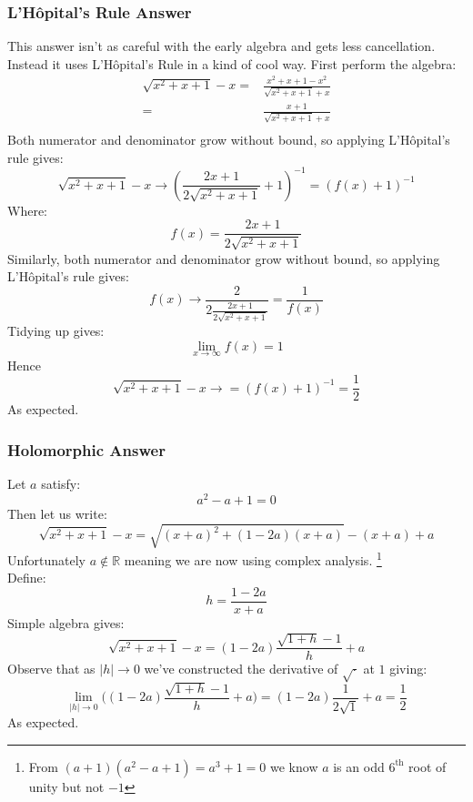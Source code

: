 \subsubsection{L'Hôpital's Rule Answer}
This answer isn't as careful with the early algebra and gets less cancellation.
Instead it uses L'Hôpital's Rule in a kind of cool way.
First perform the algebra:
\begin{equation*}
\begin{aligned}
\sqrt{x^2+x+1} - x=&\frac{x^2+x+1-  x^2}{\sqrt{x^2+x+1} + x} \\
=&\frac{x+1}{\sqrt{x^2+x+1} + x} \\
\end{aligned}
\end{equation*}
Both numerator and denominator grow without bound,
so applying L'Hôpital's rule gives:
\[\sqrt{x^2+x+1} - x\rightarrow\left(\frac{2x+1}{2\sqrt{x^2+x+1}}+1\right)^{-1}=(f(x)+1)^{-1}\]
Where:
\[f(x)=\frac{2x+1}{2\sqrt{x^2+x+1}}\]
Similarly, 
both numerator and denominator grow without bound,
so applying L'Hôpital's rule gives:
\[f(x)\rightarrow \frac{2}{2\frac{2x+1}{2\sqrt{x^2+x+1}}} = \frac{1}{f(x)}\]
Tidying up gives:
\[\lim_{x\rightarrow \infty} f(x) = 1\]
Hence
\[\sqrt{x^2+x+1} - x\rightarrow=(f(x)+1)^{-1} = \frac{1}{2}\]
As expected.

\subsubsection{Holomorphic Answer}
Let $a$ satisfy:
\[a^2-a+1=0\]
Then let us write:
\[\sqrt{x^2+x+1} - x = \sqrt{(x+a)^2+(1-2a)(x+a)}-(x+a)+a\]
Unfortunately $a\not\in \mathbb{R}$ meaning we are now using complex analysis.
\footnote{From $(a+1)(a^2-a+1)=a^3+1=0$ we know $a$ is an odd $6^\text{th}$ root of unity but not $-1$}
\\
Define:
\[h=\frac{1-2a}{x+a}\]
Simple algebra gives:
\[\sqrt{x^2+x+1} - x =(1-2a)\frac{\sqrt{1+h}-1}{h}+a\]
Observe that as $|h|\rightarrow 0$ we've constructed the derivative of $\sqrt{\cdot}$ at $1$ giving:
\[\lim_{|h|\rightarrow 0}\bigg((1-2a)\frac{\sqrt{1+h}-1}{h}+a\bigg) = (1-2a)\frac{1}{2\sqrt{1}}+a = \frac{1}{2}\]
As expected.

